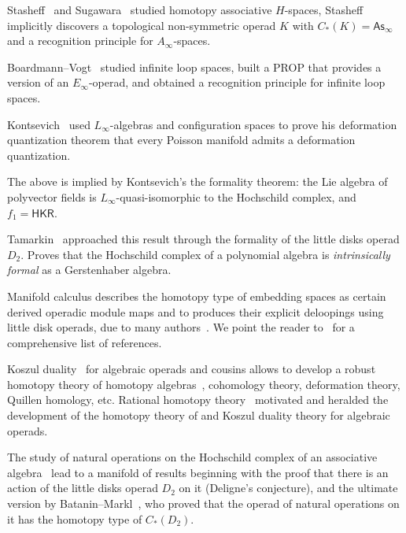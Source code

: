 \begin{tenumerate}
\item Stasheff~\cite{Stasheff1970,Stasheff1963,Stasheff1963a} and Sugawara~\cite{Sugawara55}
studied homotopy associative 
$H$-spaces, Stasheff implicitly discovers a topological
non-symmetric operad $K$ with $C_*(K) = \mathsf{As}_\infty$ and a
recognition principle for $A_\infty$-spaces.

\item Boardmann--Vogt~\cite{Boardman1973,bams/1183530111} studied infinite loop spaces,
built a PROP that provides a version of an $E_\infty$-operad, 
and obtained a recognition principle for infinite
loop spaces.

\item Kontsevich~\cite{Kontsevich2003} used $L_\infty$-algebras and
configuration spaces to prove his deformation
quantization theorem that every Poisson manifold
admits a deformation quantization.

\item The above is
implied by Kontsevich's the formality theorem: the
Lie algebra of polyvector fields is 
$L_\infty$-quasi-isomorphic to the Hochschild
complex, and $f_1 = \mathsf{HKR}$. 

\item Tamarkin~\cite{Tamarkin2003,Hinich2003} approached this result through 
the formality of the little disks operad $D_2$.
Proves that the Hochschild complex of a polynomial
algebra is \emph{intrinsically formal} as a 
Gerstenhaber algebra.

\item Manifold calculus describes the
homotopy type of embedding spaces as certain 
derived operadic module maps and to
produces their explicit deloopings
using little disk operads, due to 
many authors~\cite{Arone2007,Goodwillie1999,
Weiss1996,Weiss1999}. We point the reader
to~\cite{IdrissiPeccot} for a comprehensive
list of references.

\item Koszul duality~\cite{Ginzburg1994}
for algebraic 
operads and cousins allows to develop a robust 
homotopy theory of homotopy 
algebras~\cite{Vallette2020,Hinich1999}, cohomology
theory, deformation theory, Quillen homology, etc. Rational homotopy theory~\cite{Quillen1967,Felix2001,Sullivan1977}
motivated and heralded the development of the homotopy theory of and Koszul duality
theory for algebraic operads.

\item The study
of natural operations on the Hochschild complex
of an associative algebra~\cite{Hochschild1945} lead to a manifold of 
results beginning with the proof that there is
an action of the little disks operad $D_2$ on
it (Deligne's conjecture), and the ultimate version by Batanin--Markl~\cite{Batanin2014},
who proved that the operad of natural operations
on it has the homotopy type of $C_*(D_2)$.  
\end{tenumerate}

